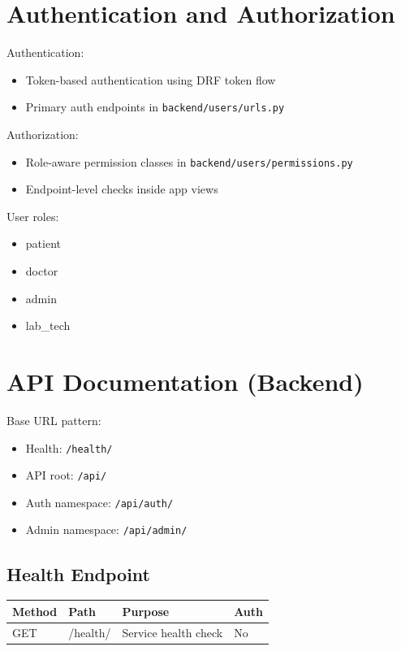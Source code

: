 \documentclass[12pt,a4paper]{article}
\begin{document}
\section{Authentication and Authorization}

Authentication:
\begin{itemize}
  \item Token-based authentication using DRF token flow
  \item Primary auth endpoints in \texttt{backend/users/urls.py}
\end{itemize}

Authorization:
\begin{itemize}
  \item Role-aware permission classes in \texttt{backend/users/permissions.py}
  \item Endpoint-level checks inside app views
\end{itemize}

User roles:
\begin{itemize}
  \item patient
  \item doctor
  \item admin
  \item lab\_tech
\end{itemize}

\section{API Documentation (Backend)}

Base URL pattern:
\begin{itemize}
  \item Health: \texttt{/health/}
  \item API root: \texttt{/api/}
  \item Auth namespace: \texttt{/api/auth/}
  \item Admin namespace: \texttt{/api/admin/}
\end{itemize}

\subsection{Health Endpoint}

\begin{longtable}{p{2cm} p{3.6cm} p{6cm} p{2cm}}
\toprule
\textbf{Method} & \textbf{Path} & \textbf{Purpose} & \textbf{Auth} \\
\midrule
GET & /health/ & Service health check & No \\
\bottomrule
\end{longtable}
\end{document}

